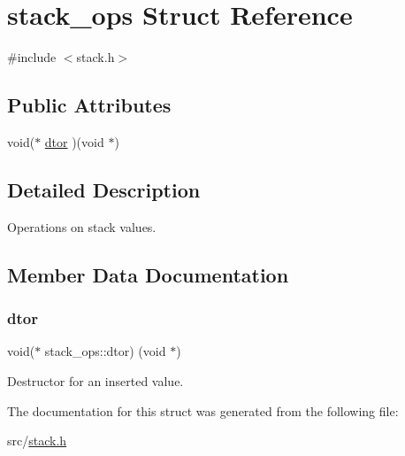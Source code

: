 \hypertarget{structstack__ops}{}\section{stack\+\_\+ops Struct Reference}
\label{structstack__ops}


{\ttfamily \#include $<$stack.\+h$>$}

\subsection*{Public Attributes}
\begin{DoxyCompactItemize}
\item 
void($\ast$ \mbox{\hyperlink{structstack__ops_a8b65ff6bf273195623789dbf3bdd4fcd}{dtor}} )(void $\ast$)
\end{DoxyCompactItemize}


\subsection{Detailed Description}
Operations on stack values. 

\subsection{Member Data Documentation}
\mbox{\label{structstack__ops_a8b65ff6bf273195623789dbf3bdd4fcd}} 
\subsubsection{\texorpdfstring{dtor}{dtor}}
{\footnotesize\ttfamily void($\ast$ stack\+\_\+ops\+::dtor) (void $\ast$)}

Destructor for an inserted value. 

The documentation for this struct was generated from the following file\+:\begin{DoxyCompactItemize}
\item 
src/\mbox{\hyperlink{stack_8h}{stack.\+h}}\end{DoxyCompactItemize}
